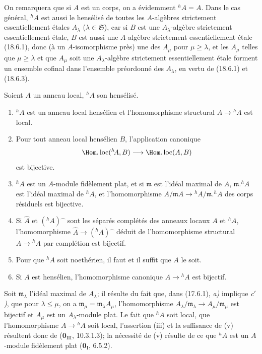 On remarquera que si $A$ est un corps, on a évidemment ${}^h\!A=A$. Dans le cas général, ${}^h\!A$ est aussi le hensélisé de toutes les $A$-algèbres strictement essentiellement étales $A_\lambda$ ($\lambda\in\mathfrak S$), car si $B$ est une $A_\lambda$-algèbre strictement essentiellement étale, $B$ est aussi une $A$-algèbre strictement essentiellement étale (18.6.1), donc (à un $A$-isomorphisme près) une des $A_\mu$ pour $\mu\geq\lambda$, et les $A_\mu$ telles que $\mu\geq\lambda$ et que $A_\mu$ soit une $A_\lambda$-algèbre strictement essentiellement étale forment un ensemble cofinal dans l'ensemble préordonné des $A_\lambda$, en vertu de (18.6.1) et (18.6.3).

\begin{theorem}[18.6.6]
\label{IV.18.6.6}
Soient $A$ un anneau local, ${}^h\!A$ son hensélisé.
\begin{enumerate}
  \item[\textup{(i)}] ${}^h\!A$ est un anneau local hensélien et l'homomorphisme structural $A\to{}^h\!A$ est local.
  \item[\textup{(ii)}] Pour tout anneau local hensélien $B$, l'application canonique
  \[
    \Hom.\operatorname{loc}({}^h\!A,B)\longrightarrow\Hom.\operatorname{loc}(A,B)
  \]
  est bijective.
  \item[\textup{(iii)}] ${}^h\!A$ est un $A$-module fidèlement plat, et si $\mathfrak m$ est l'idéal maximal de $A$, $\mathfrak m.{}^h\!A$ est l'idéal maximal de ${}^h\!A$, et l'homomorphisme $A/\mathfrak mA\to{}^h\!A/\mathfrak m.{}^h\!A$ des corps résiduels est bijective.
  \item[\textup{(iv)}] Si $\widehat A$ et $({}^h\!A)\widehat{\phantom{x}}$ sont les séparés complétés des anneaux locaux $A$ et ${}^h\!A$, l'homomorphisme $\widehat A\to({}^h\!A)\widehat{\phantom{x}}$ déduit de l'homomorphisme structural $A\to{}^h\!A$ par complétion est bijectif.
  \item[\textup{(v)}] Pour que ${}^h\!A$ soit noethérien, il faut et il suffit que $A$ le soit.
  \item[\textup{(vi)}] Si $A$ est hensélien, l'homomorphisme canonique $A\to{}^h\!A$ est bijectif.
\end{enumerate}
\end{theorem}


Soit $\mathfrak m_\lambda$ l'idéal maximal de $A_\lambda$; il résulte du fait que, dans (17.6.1), \emph{a)} implique \emph{c$'$)}, que pour $\lambda\leq\mu$, on a $\mathfrak m_\mu=\mathfrak m_\lambda A_\mu$, l'homomorphisme $A_\lambda/\mathfrak m_\lambda\to A_\mu/\mathfrak m_\mu$ est bijectif et $A_\mu$ est un $A_\lambda$-module plat. Le fait que ${}^h\!A$ soit local, que l'homomorphisme $A\to{}^h\!A$ soit local, l'assertion (iii) et la suffisance de (v) résultent donc de ($\mathbf{0}_{\mathrm{III}}$, 10.3.1.3); la nécessité de (v) résulte de ce que ${}^h\!A$ est un $A$-module fidèlement plat ($\mathbf{0}_{\mathrm I}$, 6.5.2).

